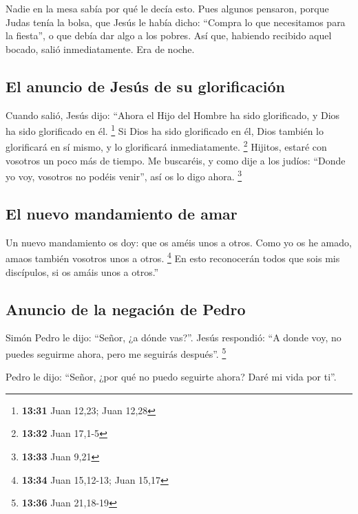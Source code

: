  Nadie en la mesa sabía por qué le decía esto.
 Pues algunos pensaron, porque Judas tenía la bolsa, que
Jesús le había dicho: ``Compra lo que necesitamos para la fiesta'', o
que debía dar algo a los pobres.  Así que, habiendo
recibido aquel bocado, salió inmediatamente. Era de noche.

\hypertarget{el-anuncio-de-jesuxfas-de-su-glorificaciuxf3n}{%
\subsection{El anuncio de Jesús de su
glorificación}\label{el-anuncio-de-jesuxfas-de-su-glorificaciuxf3n}}

 Cuando salió, Jesús dijo: ``Ahora el Hijo del Hombre ha
sido glorificado, y Dios ha sido glorificado en él. \footnote{\textbf{13:31}
  Juan 12,23; Juan 12,28}  Si Dios ha sido glorificado en
él, Dios también lo glorificará en sí mismo, y lo glorificará
inmediatamente. \footnote{\textbf{13:32} Juan 17,1-5} 
Hijitos, estaré con vosotros un poco más de tiempo. Me buscaréis, y como
dije a los judíos: ``Donde yo voy, vosotros no podéis venir'', así os lo
digo ahora. \footnote{\textbf{13:33} Juan 9,21}

\hypertarget{el-nuevo-mandamiento-de-amar}{%
\subsection{El nuevo mandamiento de
amar}\label{el-nuevo-mandamiento-de-amar}}

 Un nuevo mandamiento os doy: que os améis unos a otros.
Como yo os he amado, amaos también vosotros unos a otros. \footnote{\textbf{13:34}
  Juan 15,12-13; Juan 15,17}  En esto reconocerán todos
que sois mis discípulos, si os amáis unos a otros.''

\hypertarget{anuncio-de-la-negaciuxf3n-de-pedro}{%
\subsection{Anuncio de la negación de
Pedro}\label{anuncio-de-la-negaciuxf3n-de-pedro}}

 Simón Pedro le dijo: ``Señor, ¿a dónde vas?''. Jesús
respondió: ``A donde voy, no puedes seguirme ahora, pero me seguirás
después''. \footnote{\textbf{13:36} Juan 21,18-19}

 Pedro le dijo: ``Señor, ¿por qué no puedo seguirte
ahora? Daré mi vida por ti''.

